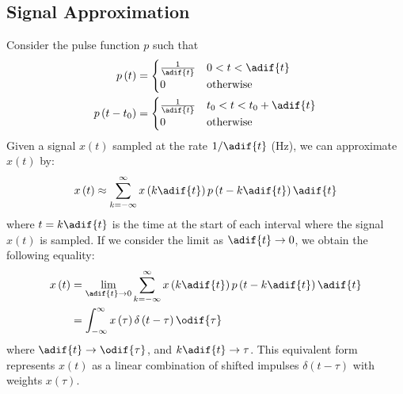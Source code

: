 \documentclass{article}
\begin{document}
\subsection{Signal Approximation}
Consider the pulse function \(p\) such that
\begin{align*}
    p\left( t \right)       & =
    \begin{cases}
        \frac{1}{\adif{t}} & 0 < t < \adif{t} \\
        0                  & \text{otherwise}
    \end{cases}
    \\
    p\left( t - t_0 \right) & =
    \begin{cases}
        \frac{1}{\adif{t}} & t_0 < t < t_0 + \adif{t} \\
        0                  & \text{otherwise}
    \end{cases}
\end{align*}
Given a signal \(x\left( t \right)\) sampled at the rate \(1/\adif{t}\) (\unit{Hz}),
we can approximate \(x\left( t \right)\) by:
\begin{equation*}
    x\left( t \right) \approx \sum_{k = -\infty}^\infty x\left( k \adif{t} \right) p\left( t - k \adif{t} \right) \adif{t}
\end{equation*}
where \(t = k \adif{t}\) is the time at the start of each interval where the signal \(x\left( t \right)\) is sampled.
If we consider the limit as \(\adif{t} \to 0\), we obtain the following
equality:
\begin{align*}
    x\left( t \right) & = \lim_{\adif{t} \to 0} \sum_{k = -\infty}^\infty x\left( k \adif{t} \right) p\left( t - k \adif{t} \right) \adif{t} \\
                      & = \int_{-\infty}^\infty x\left( \tau \right) \delta\left( t - \tau \right) \odif{\tau}
\end{align*}
where \(\adif{t} \to \odif{\tau}\), and \(k \adif{t} \to \tau\).
This equivalent form represents \(x\left( t \right)\) as a linear combination of shifted impulses \(\delta\left( t - \tau \right)\)
with weights \(x\left( \tau \right)\).
\end{document}
